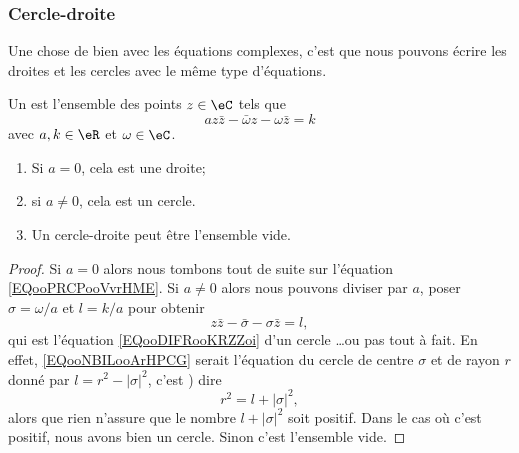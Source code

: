 \subsubsection{Cercle-droite}

Une chose de bien avec les équations complexes, c'est que nous pouvons écrire les droites et les cercles avec le même type d'équations.

\begin{lemmaDef}
    Un  est l'ensemble des points \( z\in \eC\) tels que
    \begin{equation}
        az\bar z-\bar\omega z-\omega\bar z=k
    \end{equation}
    avec \( a,k\in \eR\) et \( \omega\in \eC\).
    \begin{enumerate}
        \item
            Si \( a=0\), cela est une droite;
        \item
            si \( a\neq 0\), cela est un cercle.
        \item
            Un cercle-droite peut être l'ensemble vide.
    \end{enumerate}
\end{lemmaDef}

\begin{proof}
    Si \( a=0\) alors nous tombons tout de suite sur l'équation \eqref{EQooPRCPooVvrHME}. Si \( a\neq 0\) alors nous pouvons diviser par \( a\), poser \( \sigma=\omega/a\) et \( l=k/a\) pour obtenir
    \begin{equation}        \label{EQooNBILooArHPCG}
        z\bar z-\bar\sigma-\sigma\bar z=l,
    \end{equation}
    qui est l'équation \eqref{EQooDIFRooKRZZoi} d'un cercle \ldots ou pas tout à fait. En effet, \eqref{EQooNBILooArHPCG} serait l'équation du cercle de centre \( \sigma\) et de rayon \( r\) donné par $l=r^2-| \sigma |^2$, c'est ) dire
    \begin{equation}
        r^2=l+| \sigma |^2,
    \end{equation}
    alors que rien n'assure que le nombre \( l+| \sigma |^2\) soit positif. Dans le cas où c'est positif, nous avons bien un cercle. Sinon c'est l'ensemble vide.
\end{proof}

